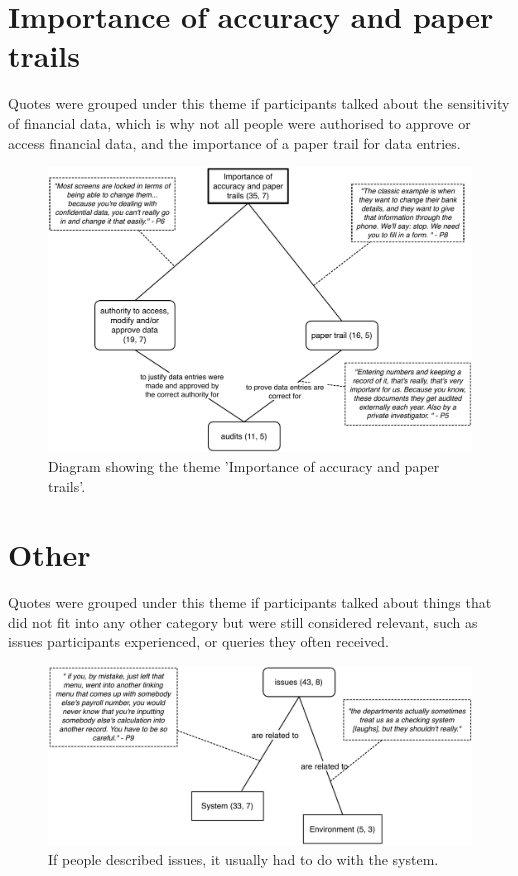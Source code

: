 \section{Importance of accuracy and paper trails}
Quotes were grouped under this theme if participants talked about the sensitivity of financial data, which is why not all people were authorised to approve or access financial data, and the importance of a paper trail for data entries. 

\begin{figure}[!ht]
\centering
\includegraphics[width=\textwidth]{images/ch12/Papertrail.pdf}
\caption[Study 1 Importance of accuracy and paper trails diagram]{Diagram showing the theme 'Importance of accuracy and paper trails'.}
\vspace{-9pt}
\label{fig:ch3_papertrail}
\end{figure}
\newpage
\section{Other}
Quotes were grouped under this theme if participants talked about things that did not fit into any other category but were still considered relevant, such as issues participants experienced, or queries they often received.

\begin{figure}[!ht]
\centering
\includegraphics[width=\textwidth]{images/ch12/Other.pdf}
\caption[Study 1 Other diagram]{If people described issues, it usually had to do with the system.}
\vspace{-9pt}
\label{fig:ch3_other}
\end{figure}


